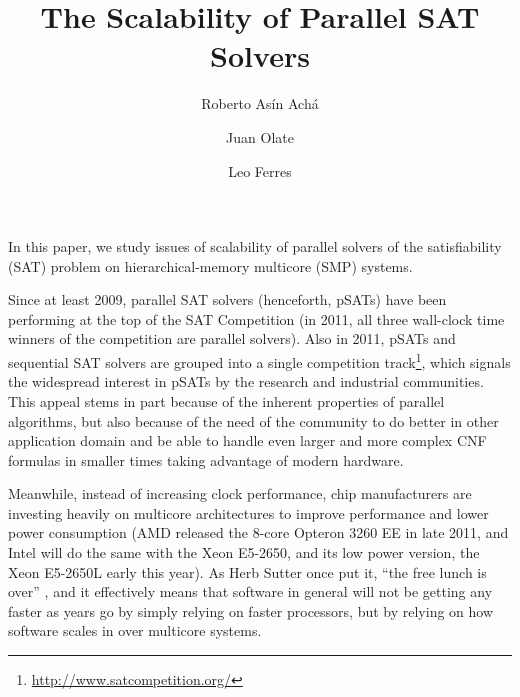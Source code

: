 \documentclass{llncs}
\begin{document}


\newcommand{\pling}{{\tt plingeling}}
\newcommand{\barc}{Barelogic$^S$}
\title{The Scalability of Parallel SAT Solvers}

\author{Roberto As\'in Ach\'a \and Juan Olate  \and Leo Ferres }


\maketitle

In this paper, we study issues of scalability of parallel solvers of
the satisfiability (SAT) problem on hierarchical-memory multicore
(SMP) systems.

Since at least 2009, parallel SAT solvers (henceforth, pSATs) have
been performing at the top of the SAT Competition (in 2011, all three
wall-clock time winners of the competition are parallel solvers).
Also in 2011, pSATs and sequential SAT solvers are grouped into a
single competition
track\footnote{\url{http://www.satcompetition.org/}}, which signals
the widespread interest in pSATs by the research and industrial
communities. This appeal stems in part because of the inherent
properties of parallel algorithms, but also because of the need of 
the community to do better in other application domain and be able to 
handle even larger and more complex CNF formulas in smaller times 
taking advantage of modern hardware. 


Meanwhile, instead of increasing clock performance, chip manufacturers
are investing heavily on multicore architectures to improve
performance and lower power consumption (AMD released the 8-core
Opteron 3260 EE in late 2011, and Intel will do the same with the Xeon
E5-2650, and its low power version, the Xeon E5-2650L early this
year). As Herb Sutter once put it, ``the free lunch is over''
\cite{FreeLunchIsOver}, and it effectively means that software in
general will not be getting any faster as years go by simply
relying on faster processors, but by relying on how software scales in
over multicore systems.
\end{document}
